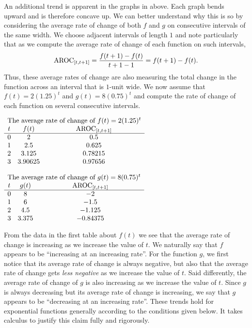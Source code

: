 \documentclass[nooutcomes]{ximera}
\begin{document}
An additional trend is apparent in the graphs in above.  Each graph bends upward and is therefore concave up.  We can better understand why this is so by considering the average rate of change of both $f$ and $g$ on consecutive intervals of the same width.  We choose adjacent intervals of length $1$ and note particularly that as we compute the average rate of change of each function on such intervals,%
\begin{equation*}
\mathrm{AROC}_{[t,t+1]} = \frac{f(t+1) - f(t)}{t+1-1} = f(t+1) - f(t)\text{.}
\end{equation*}
Thus, these average rates of change are also measuring the total change in the function across an interval that is $1$-unit wide. We now assume that $f(t) = 2 (1.25)^t$ and $g(t) = 8(0.75)^t$ and compute the rate of change of each function on several consecutive intervals.


\begin{center}
$
{\begin{array}{ccc}
\multicolumn{3}{c}{\text{The average rate of change of } f(t) = 2(1.25)^t}\\
t&f(t)&\av_{[t,t+1]}\\
\hline
0&2&0.5\\
1&2.5&0.625\\
2&3.125&0.78215\\
3&3.90625&0.97656
\end{array}}%
$
\end{center}
\begin{center}
$
{\begin{array}{ccc}
\multicolumn{3}{c}{\text{The average rate of change of } g(t) = 8(0.75)^t}\\
t&g(t)&\av_{[t,t+1]}\\
\hline
0&8&-2\\
1&6&-1.5\\
2&4.5&-1.125\\
3&3.375&-0.84375
\end{array}}%
$
\end{center}

From the data in the first table about $f(t)$ we see that the average rate of change is increasing as we increase the value of $t$.  We naturally say that $f$ appears to be ``increasing at an increasing rate''.  For the function $g$, we first notice that its average rate of change is always negative, but also that the average rate of change gets \emph{less negative} as we increase the value of $t$. Said differently, the average rate of change of $g$ is also increasing as we increase the value of $t$.  Since $g$ is always decreasing but its average rate of change is increasing, we say that $g$ appears to be ``decreasing at an increasing rate''.  These trends hold for exponential functions generally according to the conditions given below.  It takes calculus to justify this claim fully and rigorously. 
\end{document}
